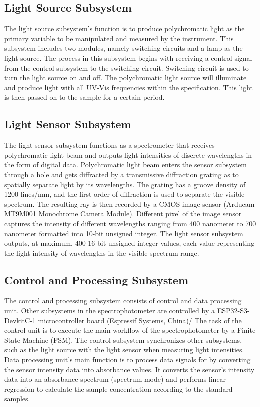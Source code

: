 \documentclass[conference]{IEEEtran}
\begin{document}
\subsection{Light Source Subsystem}
The light source subsystem's function is to produce polychromatic light as the primary variable to be manipulated and measured by the instrument.
This subsystem includes two modules, namely switching circuits and a lamp as the light source.
The process in this subsystem begins with receiving a control signal from the control subsystem to the switching circuit.
Switching circuit is used to turn the light source on and off.
The polychromatic light source will illuminate and produce light with all UV-Vis frequencies within the specification.
This light is then passed on to the sample for a certain period.

\subsection{Light Sensor Subsystem}
The light sensor subsystem functions as a spectrometer that receives polychromatic light beam and outputs light intensities of discrete wavelengths in the form of digital data.
Polychromatic light beam enters the sensor subsystem through a hole and gets diffracted by a transmissive diffraction grating as to spatially separate light by its wavelengths.
The grating has a groove density of 1200 lines/mm, and the first order of diffraction is used to separate the visible spectrum.
The resulting ray is then recorded by a CMOS image sensor (Arducam MT9M001 Monochrome Camera Module).
Different pixel of the image sensor captures the intensity of different wavelengths ranging from 400 nanometer to 700 nanometer formatted into 10-bit unsigned integer.
The light sensor subsystem outputs, at maximum, 400 16-bit unsigned integer values, each value representing the light intensity of wavelengths in the visible spectrum range. 

\subsection{Control and Processing Subsystem}
The control and processing subsystem consists of control and data processing unit.
Other subsystems in the spectrophotometer are controlled by a ESP32-S3-DevkitC-1 microcontroller board (Espressif Systems, China)/
The task of the control unit is to execute the main workflow of the spectrophotometer by a Finite State Machine (FSM).
The control subsystem synchronizes other subsystems, such as the light source with the light sensor when measuring light intensities.
Data processing unit's main function is to process data signals for by converting the sensor intensity data into absorbance values.
It converts the sensor's intensity data into an absorbance spectrum (spectrum mode) and performs linear regression to calculate the sample concentration according to the standard samples.
\end{document}
